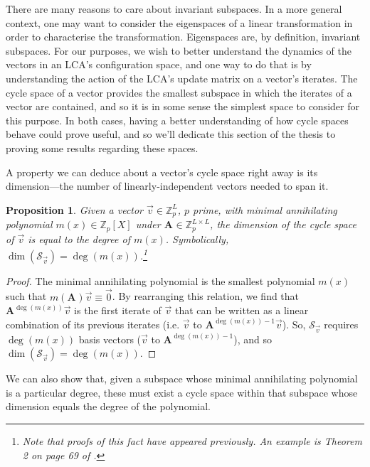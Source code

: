 \documentclass[a4paper, 12pt, reqno]{amsart}
\newtheorem{prop}{Proposition}
\newcommand{\Z}{\mathbb{Z}}
\newcommand\Mat[2][]{\mathbf{#1}^{\!#2}}
\newcommand{\cycsp}[1]{\mathcal{S}_{#1}}
\begin{document}
	There are many reasons to care about invariant subspaces. In a more general context, one may want to consider the eigenspaces of a linear transformation in order to
	characterise the transformation. Eigenspaces are, by definition, invariant subspaces. For our purposes, we wish to better understand the dynamics of the vectors in an
	LCA's configuration space, and one way to do that is by understanding the action of the LCA's update matrix on a vector's iterates. The cycle space of a vector provides
	the smallest subspace in which the iterates of a vector are contained, and so it is in some sense the simplest space to consider for this purpose. In both cases, having a
	better understanding of how cycle spaces behave could prove useful, and so we'll dedicate this section of the thesis to proving some results regarding these spaces.
	
	A property we can deduce about a vector's cycle space right away is its dimension---the number of linearly-independent vectors needed to span it.
	
	\begin{prop}
		\label{prop:cycSpaceDim}
		Given a vector $\vec{v} \in \Z_p^L$, $p$ prime, with minimal annihilating polynomial $m(x) \in \Z_p[X]$ under $\Mat[A]{} \in \Z_p^{L \times L}$, the dimension of 
		the cycle space of $\vec{v}$ is equal to the degree of $m(x)$. Symbolically, $\dim(\cycsp{\vec{v}}) = \deg(m(x))$.\footnote{Note that proofs of this fact have appeared
		previously. An example is Theorem 2 on page 69 of \citet{Jacobson1953}.}
	\end{prop}
	\begin{proof}
		The minimal annihilating polynomial is the smallest polynomial $m(x)$ such that $m(\Mat[A]{})\vec{v} \equiv \vec{0}$. By rearranging this relation, we find that 
		$\Mat[A]{\deg(m(x))}\vec{v}$ is the first iterate of $\vec{v}$ that can be written as a linear combination of its previous iterates (i.e. $\vec{v}$ to 
		$\Mat[A]{\deg(m(x))-1}\vec{v}$). So, $\cycsp{\vec{v}}$ requires $\deg(m(x))$ basis vectors ($\vec{v}$ to $\Mat[A]{\deg(m(x))-1}$), and so 
		$\dim(\cycsp{\vec{v}}) = \deg(m(x))$.
	\end{proof}
	
	We can also show that, given a subspace whose minimal annihilating polynomial is a particular degree, these must exist a cycle space within that subspace whose dimension
	equals the degree of the polynomial.
	
\end{document}
